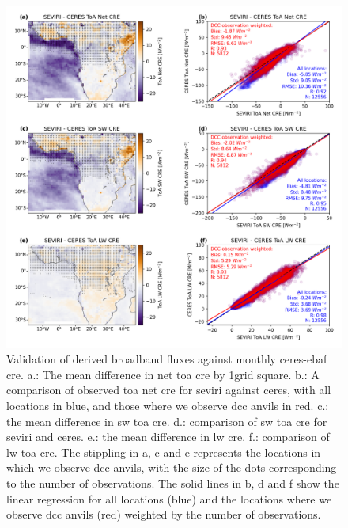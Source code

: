 \begin{figure}[tp]
    \includegraphics[width=\textwidth]{figures/chapter4_03.png}
    \caption[
    Validation of derived broadband fluxes against monthly \acrshort{ceres}-\acrshort{ebaf} \acrshort{cre}
    ]{
    Validation of derived broadband fluxes against monthly \acrshort{ceres}-\acrshort{ebaf} \acrshort{cre}. a.: The mean difference in net \acrshort{toa} \acrshort{cre} by 1\textdegree grid square. b.: A comparison of observed \acrshort{toa} net \acrshort{cre} for \acrshort{seviri} against \acrshort{ceres}, with all locations in blue, and those where we observe \acrshort{dcc} anvils in red. c.: the mean difference in \acrshort{sw} \acrshort{toa} \acrshort{cre}. d.: comparison of \acrshort{sw} \acrshort{toa} \acrshort{cre} for \acrshort{seviri} and \acrshort{ceres}. e.: the mean difference in \acrshort{lw} \acrshort{cre}. f.: comparison of \acrshort{lw} \acrshort{toa} \acrshort{cre}. The stippling in a, c and e represents the locations in which we observe \acrshort{dcc} anvils, with the size of the dots corresponding to the number of observations. The solid lines in b, d and f show the linear regression for all locations (blue) and the locations where we observe \acrshort{dcc} anvils (red) weighted by the number of observations.
    }
    \label{fig:flux_validation}
\end{figure}

